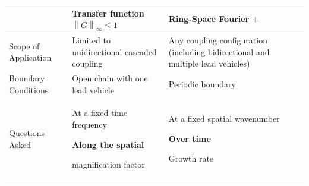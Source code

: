 \documentclass[11pt,a4paper,openany]{book}
\numberwithin{equation}{chapter}
\numberwithin{figure}{chapter}
\numberwithin{table}{chapter}
\begin{document}
\begin{center}
\small
{}
\label{tab:transfer-versus-ring}
\begin{tabular}{p{3.0cm}p{5.4cm}p{5.4cm}}
\toprule
& \textbf{Transfer function $\left\|G\right\|_\infty\le1$} & \textbf{Ring-Space Fourier $+$} \\
\midrule







Scope of Application




&




 Limited to unidirectional cascaded coupling




&




 Any coupling configuration (including bidirectional and multiple lead vehicles)



\\[4pt]

Boundary Conditions




&




 Open chain with one lead vehicle




&




 Periodic boundary\\[4pt]

Questions Asked




&




At a fixed time frequency




\textbf{Along the spatial}




magnification factor




&




 At a fixed spatial wavenumber




\textbf{Over time}




Growth rate




\end{tabular}
\end{center}
\end{document}
